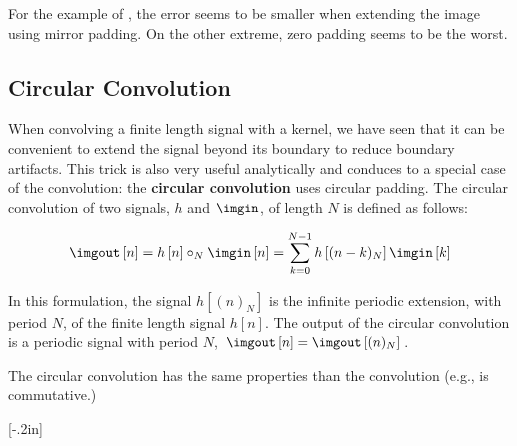 For the example of \fig{\ref{fig:boundaries}}, the error seems to be smaller when extending the image using mirror padding. On the other extreme, zero padding seems to be the worst. 
%






\subsection{Circular Convolution}

When convolving a finite length signal with a kernel, we have seen that it can be convenient to extend the signal beyond its boundary to reduce boundary artifacts. This trick is also very useful analytically and conduces to a special case of the convolution: the {\bf circular convolution} uses circular padding. The circular convolution of two signals, $h$ and $\imgin$, of length $N$ is defined as follows:

\begin{equation}
\imgout \left[n\right] = h \left[n\right] \circ_N \imgin \left[n\right] =  \sum_{k=0}^{N-1} h \left[(n-k)_N \right] \imgin \left[k \right]
\end{equation}



In this formulation, the signal $h \left[ (n)_N \right]$ is the infinite periodic extension, with period $N$, of the finite length signal $h \left[n \right]$. The output of the circular convolution is a periodic signal with period $N$, $\imgout \left[n \right] = \imgout \left[(n)_N \right]$.


The circular convolution has the same properties than the convolution (e.g., is commutative.)

[-.2in]

